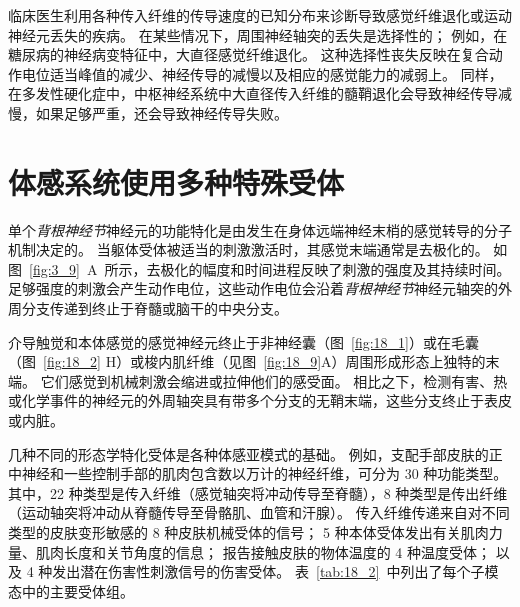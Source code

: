 临床医生利用各种传入纤维的传导速度的已知分布来诊断导致感觉纤维退化或运动神经元丢失的疾病。
在某些情况下，周围神经轴突的丢失是选择性的；
例如，在糖尿病的神经病变特征中，大直径感觉纤维退化。
这种选择性丧失反映在复合动作电位适当峰值的减少、神经传导的减慢以及相应的感觉能力的减弱上。
同样，在多发性硬化症中，中枢神经系统中大直径传入纤维的髓鞘退化会导致神经传导减慢，如果足够严重，还会导致神经传导失败。


\section{体感系统使用多种特殊受体}

单个\textit{背根神经节}神经元的功能特化是由发生在身体远端神经末梢的感觉转导的分子机制决定的。
当躯体受体被适当的刺激激活时，其感觉末端通常是去极化的。
如图~\ref{fig:3_9}~A~所示，去极化的幅度和时间进程反映了刺激的强度及其持续时间。
足够强度的刺激会产生动作电位，这些动作电位会沿着\textit{背根神经节}神经元轴突的外周分支传递到终止于脊髓或脑干的中央分支。


介导触觉和本体感觉的感觉神经元终止于非神经囊（图~\ref{fig:18_1}）或在毛囊（图~\ref{fig:18_2} H）或梭内肌纤维（见图~\ref{fig:18_9}A）周围形成形态上独特的末端。
它们感觉到机械刺激会缩进或拉伸他们的感受面。
相比之下，检测有害、热或化学事件的神经元的外周轴突具有带多个分支的无鞘末端，这些分支终止于表皮或内脏。


几种不同的形态学特化受体是各种体感亚模式的基础。
例如，支配手部皮肤的正中神经和一些控制手部的肌肉包含数以万计的神经纤维，可分为 30 种功能类型。
其中，22 种类型是传入纤维（感觉轴突将冲动传导至脊髓），8 种类型是传出纤维（运动轴突将冲动从脊髓传导至骨骼肌、血管和汗腺）。
传入纤维传递来自对不同类型的皮肤变形敏感的 8 种皮肤机械受体的信号；
5 种本体受体发出有关肌肉力量、肌肉长度和关节角度的信息；
报告接触皮肤的物体温度的 4 种温度受体；
以及 4 种发出潜在伤害性刺激信号的伤害受体。
表~\ref{tab:18_2}~中列出了每个子模态中的主要受体组。


